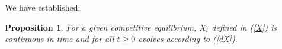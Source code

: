 \documentclass[12pt]{article}
\newtheorem{proposition}{Proposition}
\newcommand{\NW}[1]{{\textcolor{blue}{#1}}}
\newcommand{\WJ}[1]{{\textcolor{red}{#1}}}
\newcommand{\TS}[1]{{\textcolor{magenta}{#1}}}
\begin{document}
%
%
%
%
%
%
%
%
%

We have established: %
	\begin{proposition} 
		{For a given competitive equilibrium, $X_t$ defined in (\ref{X}) is continuous in time and for all $t \geq 0$ evolves according to  (\ref{dX}).} 
	\end{proposition}
%
	
\end{document}
